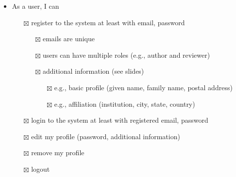 \documentclass[nochapterpage,nopartpage,noheadingspace,numbersubsubsec,bigchapter,colorback,accentcolor=tud9c,10pt]{tudreport}
\begin{document}
\begin{itemize}
            \item As a user, I can
            \begin{itemize}
                \item[$\boxtimes$] register to the system at least with email, password
                \begin{itemize}
                    \item[$\boxtimes$] emails are unique
                    \item[$\boxtimes$] users can have multiple roles (e.g., author and reviewer)
                    \item[$\boxtimes$] additional information (see slides)
                    \begin{itemize}
                        \item[$\boxtimes$] e.g., basic profile (given name, family name, postal address)
                        \item[$\boxtimes$] e.g., affiliation (institution, city, state, country)
                    \end{itemize}
                \end{itemize}
                \item[$\boxtimes$] login to the system at least with registered email, password
                \item[$\boxtimes$] edit my profile (password, additional information)
                \item[$\boxtimes$] remove my profile
                \item[$\boxtimes$] logout
            \end{itemize}


\end{itemize}
\end{document}
